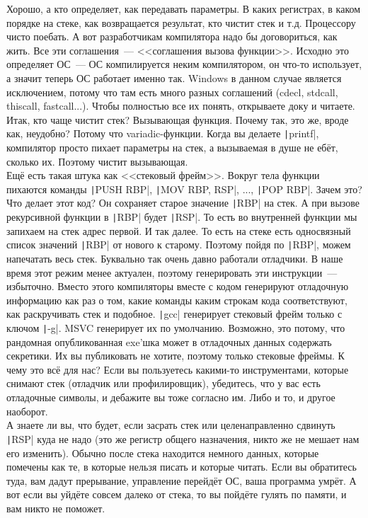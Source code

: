 \documentclass{article}
\begin{document}
    Хорошо, а кто определяет, как передавать параметры. В каких регистрах, в каком порядке на стеке, как возвращается результат, кто чистит стек и т.д. Процессору чисто поебать. А вот разработчикам компилятора надо бы договориться, как жить. Все эти соглашения~--- <<соглашения вызова функции>>. Исходно это определяет ОС~--- ОС компилируется неким компилятором, он что-то использует, а значит теперь ОС работает именно так. Windows в данном случае является исключением, потому что там есть много разных соглашений (cdecl, stdcall, thiscall, fastcall...). Чтобы полностью все их понять, открываете доку и читаете. Итак, кто чаще чистит стек? Вызывающая функция. Почему так, это же, вроде как, неудобно? Потому что variadic-функции. Когда вы делаете \texttt|printf|, компилятор просто пихает параметры на стек, а вызываемая в душе не ебёт, сколько их. Поэтому чистит вызывающая.\\
    Ещё есть такая штука как <<стековый фрейм>>. Вокруг тела функции пихаются команды \texttt|PUSH RBP|, \texttt|MOV RBP, RSP|, ..., \texttt|POP RBP|. Зачем это? Что делает этот код? Он сохраняет старое значение \texttt|RBP| на стек. А при вызове рекурсивной функции в \texttt|RBP| будет \texttt|RSP|. То есть во внутренней функции мы запихаем на стек адрес первой. И так далее. То есть на стеке есть односвязный список значений \texttt|RBP| от нового к старому. Поэтому пойдя по \texttt|RBP|, можем напечатать весь стек. Буквально так очень давно работали отладчики. В наше время этот режим менее актуален, поэтому генерировать эти инструкции~--- избыточно. Вместо этого компиляторы вместе с кодом генерируют отладочную информацию как раз о том, какие команды каким строкам кода соответствуют, как раскручивать стек и подобное. \texttt|gcc| генерирует стековый фрейм только с ключом \texttt|-g|. MSVC генерирует их по умолчанию. Возможно, это потому, что рандомная опубликованная exe'шка может в отладочных данных содержать секретики. Их вы публиковать не хотите, поэтому только стековые фреймы. К чему это всё для нас? Если вы пользуетесь какими-то инструментами, которые снимают стек (отладчик или профилировщик), убедитесь, что у вас есть отладочные символы, и дебажите вы тоже согласно им. Либо и то, и другое наоборот.\\
    А знаете ли вы, что будет, если засрать стек или целенаправленно сдвинуть \texttt|RSP| куда не надо (это же регистр общего назначения, никто же не мешает нам его изменить). Обычно после стека находится немного данных, которые помечены как те, в которые нельзя писать и которые читать. Если вы обратитесь туда, вам дадут прерывание, управление перейдёт ОС, ваша программа умрёт. А вот если вы уйдёте совсем далеко от стека, то вы пойдёте гулять по памяти, и вам никто не поможет.
\end{document}
